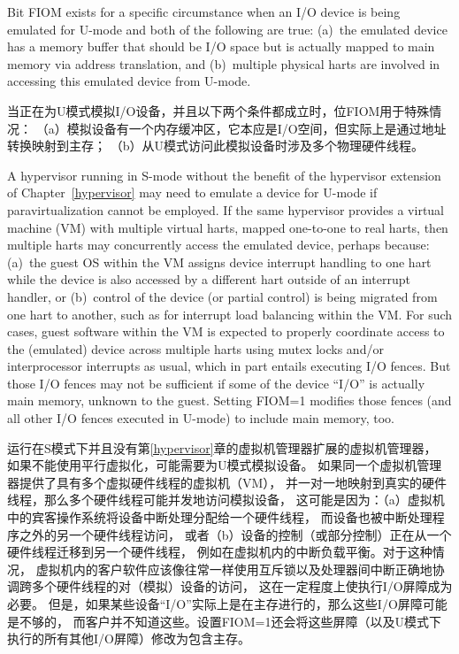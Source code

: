 \begin{commentary}

  Bit FIOM exists for a specific circumstance when an I/O device is
  being emulated for U-mode and both of the following are true:
  (a)~the emulated device has a memory buffer that should be I/O space
  but is actually mapped to main memory via address translation, and
  (b)~multiple physical harts are involved in accessing this emulated
  device from U-mode.

当正在为U模式模拟I/O设备，并且以下两个条件都成立时，位FIOM用于特殊情况：
（a）模拟设备有一个内存缓冲区，它本应是I/O空间，但实际上是通过地址转换映射到主存；
（b）从U模式访问此模拟设备时涉及多个物理硬件线程。

A hypervisor running in S-mode without the benefit of the hypervisor
extension of Chapter~\ref{hypervisor} may need to emulate a device for
U-mode if paravirtualization cannot be employed.
If the same hypervisor provides a virtual machine (VM) with multiple
virtual harts, mapped one-to-one to real harts, then multiple harts may
concurrently access the emulated device, perhaps because:
(a)~the guest OS within the VM assigns device interrupt handling to one
hart while the device is also accessed by a different hart outside of
an interrupt handler, or
(b)~control of the device (or partial control) is being migrated
from one hart to another, such as for interrupt load balancing within
the VM.
For such cases, guest software within the VM is expected to properly
coordinate access to the (emulated) device across multiple harts using
mutex locks and/or interprocessor interrupts as usual, which in part
entails executing I/O fences.
But those I/O fences may not be sufficient if some of the device
``I/O'' is actually main memory, unknown to the guest.
Setting FIOM=1 modifies those fences (and all other I/O fences executed
in U-mode) to include main memory, too.

运行在S模式下并且没有第\ref{hypervisor}章的虚拟机管理器扩展的虚拟机管理器，
如果不能使用平行虚拟化，可能需要为U模式模拟设备。
如果同一个虚拟机管理器提供了具有多个虚拟硬件线程的虚拟机（VM），
并一对一地映射到真实的硬件线程，那么多个硬件线程可能并发地访问模拟设备，
这可能是因为：（a）虚拟机中的宾客操作系统将设备中断处理分配给一个硬件线程，
而设备也被中断处理程序之外的另一个硬件线程访问，
或者（b）设备的控制（或部分控制）正在从一个硬件线程迁移到另一个硬件线程，
例如在虚拟机内的中断负载平衡。对于这种情况，
虚拟机内的客户软件应该像往常一样使用互斥锁以及处理器间中断正确地协调跨多个硬件线程的对（模拟）设备的访问，
这在一定程度上使执行I/O屏障成为必要。
但是，如果某些设备“I/O”实际上是在主存进行的，那么这些I/O屏障可能是不够的，
而客户并不知道这些。设置FIOM=1还会将这些屏障（以及U模式下执行的所有其他I/O屏障）修改为包含主存。


\end{commentary}
